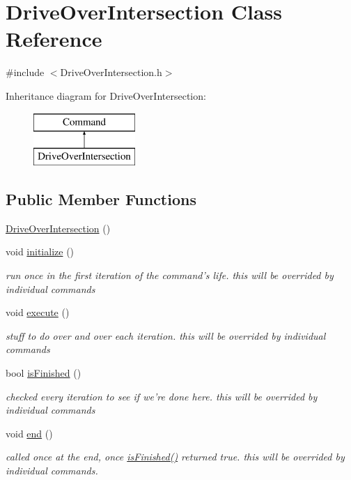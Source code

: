 \hypertarget{classDriveOverIntersection}{\section{Drive\-Over\-Intersection Class Reference}
\label{classDriveOverIntersection}
}


{\ttfamily \#include $<$Drive\-Over\-Intersection.\-h$>$}

Inheritance diagram for Drive\-Over\-Intersection\-:\begin{figure}[H]
\begin{center}
\leavevmode
\includegraphics[height=2.000000cm]{classDriveOverIntersection}
\end{center}
\end{figure}
\subsection*{Public Member Functions}
\begin{DoxyCompactItemize}
\item 
\hyperlink{classDriveOverIntersection_a4fd6378b9ef223d86eebdf4af0547752}{Drive\-Over\-Intersection} ()
\item 
void \hyperlink{classDriveOverIntersection_a1c8abfebdde3f16e3110bca280365640}{initialize} ()
\begin{DoxyCompactList}\small\item\em run once in the first iteration of the command's life. this will be overrided by individual commands \end{DoxyCompactList}\item 
void \hyperlink{classDriveOverIntersection_a0bb9f5c91c23583810510f60cdd49523}{execute} ()
\begin{DoxyCompactList}\small\item\em stuff to do over and over each iteration. this will be overrided by individual commands \end{DoxyCompactList}\item 
bool \hyperlink{classDriveOverIntersection_a5dc540c24099462e2bc14923648f42b0}{is\-Finished} ()
\begin{DoxyCompactList}\small\item\em checked every iteration to see if we're done here. this will be overrided by individual commands \end{DoxyCompactList}\item 
void \hyperlink{classDriveOverIntersection_a90d8b3592d6c67e9ef1ae1a6396aa1c2}{end} ()
\begin{DoxyCompactList}\small\item\em called once at the end, once \hyperlink{classDriveOverIntersection_a5dc540c24099462e2bc14923648f42b0}{is\-Finished()} returned true. this will be overrided by individual commands. \end{DoxyCompactList}\end{DoxyCompactItemize}
